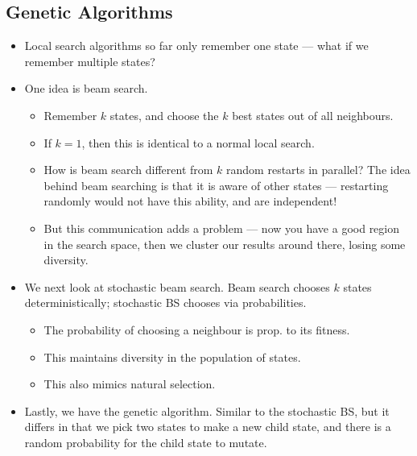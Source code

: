 \documentclass{article}
\begin{document}
\subsection{Genetic Algorithms}
\begin{itemize}
    \item Local search algorithms so far only remember one state --- what if we remember multiple states?
    \item One idea is beam search.
        \begin{itemize}
            \item Remember $k$ states, and choose the $k$ best states out of all neighbours.
            \item If $k = 1$, then this is identical to a normal local search.
            \item How is beam search different from $k$ random restarts in parallel?  The idea behind beam searching is that it is aware of other states --- restarting randomly would not have this ability, and are independent!
            \item But this communication adds a problem --- now you have a good region in the search space, then we cluster our results around there, losing some diversity.
        \end{itemize}
    \item We next look at stochastic beam search.  Beam search chooses $k$ states deterministically; stochastic BS chooses via probabilities.
        \begin{itemize}
            \item The probability of choosing a neighbour is prop. to its fitness.
            \item This maintains diversity in the population of states.
            \item This also mimics natural selection.
        \end{itemize}
    \item Lastly, we have the genetic algorithm.  Similar to the stochastic BS, but it differs in that we pick two states to make a new child state, and there is a random probability for the child state to mutate.
\end{itemize}
\end{document}
